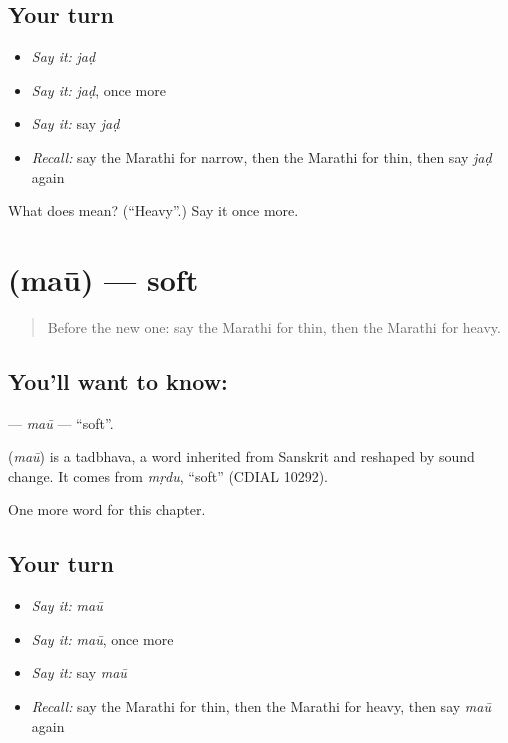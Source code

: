 \subsection*{Your turn}
\begin{itemize}
\raggedright
  \item \emph{Say it:} \emph{jaḍ}
  \item \emph{Say it:} \emph{jaḍ}, once more
  \item \emph{Say it:} say \emph{jaḍ}
  \item \emph{Recall:} say the Marathi for narrow, then the Marathi for thin, then say \emph{jaḍ} again
\end{itemize}

\begin{tcolorbox}[breakable,colback=teal!4,colframe=teal!35!black,title={Before you move on}]
What does  mean? (\textquotedblleft{}Heavy\textquotedblright{}.) Say it once more.
\end{tcolorbox}
\section[\texorpdfstring{\mr{मऊ} (maū)}{मऊ (maū)}]{ (maū) — soft}

\label{lesson:MR-C148-mau}



\begin{quote}
Before the new one: say the Marathi for thin, then the Marathi for heavy.
\end{quote}

\subsection*{You'll want to know: }
\textbf{} — \emph{maū} — \textquotedblleft{}soft\textquotedblright{}.

\begin{cousinweb}
\textbf{} (\emph{maū}) is a tadbhava, a word inherited from Sanskrit and reshaped by sound change. It comes from \emph{mṛdu}, \textquotedblleft{}soft\textquotedblright{} (CDIAL 10292).
\end{cousinweb}

\begin{grammarlens}[title={What you've built}]
One more word for this chapter.
\end{grammarlens}

\subsection*{Your turn}
\begin{itemize}
\raggedright
  \item \emph{Say it:} \emph{maū}
  \item \emph{Say it:} \emph{maū}, once more
  \item \emph{Say it:} say \emph{maū}
  \item \emph{Recall:} say the Marathi for thin, then the Marathi for heavy, then say \emph{maū} again
\end{itemize}

